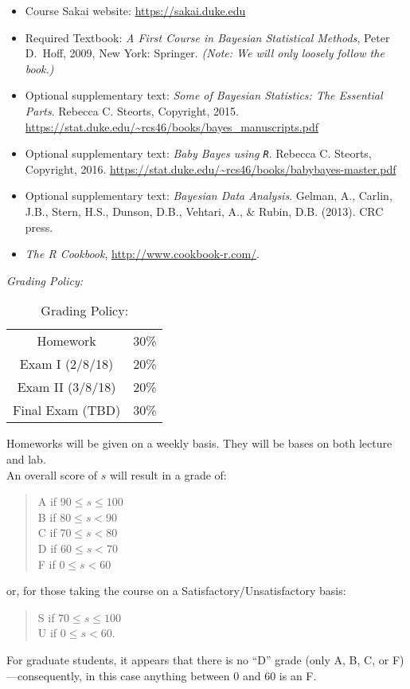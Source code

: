 \documentclass[11pt]{article}
\begin{document}
\begin{itemize}
\item[] Course Sakai website: \url{https://sakai.duke.edu}
\item[] Required Textbook: \textit{A First Course in Bayesian Statistical Methods}, Peter D.\ Hoff, 2009, New York: Springer. \textit{(Note: We will only loosely follow the book.)}
\item[] Optional supplementary text:  \textit{Some of Bayesian Statistics: The Essential Parts}. Rebecca C. Steorts, Copyright, 2015. \url{https://stat.duke.edu/~rcs46/books/bayes_manuscripts.pdf}
\item[] Optional supplementary text:  \textit{Baby Bayes using \texttt{R}}. Rebecca C. Steorts, Copyright, 2016. 
\url{https://stat.duke.edu/~rcs46/books/babybayes-master.pdf}
\item[] Optional supplementary text:  \textit{Bayesian Data Analysis}. Gelman, A., Carlin, J.B., Stern, H.S., Dunson, D.B., Vehtari, A., \& Rubin, D.B. (2013). CRC press.
\item[] \emph{The R Cookbook}, \url{http://www.cookbook-r.com/}.
\end{itemize}

\emph{Grading Policy:} 

\begin{table}[ht]
\caption{Grading Policy:}
\begin{center}
\begin{tabular}{cc}
Homework &30\%\\
Exam I (2/8/18) &20\%\\
Exam  II (3/8/18) & 20\%\\
Final Exam  (TBD) & 30\%\\
\end{tabular}
\end{center}
\label{default}
\end{table}%

Homeworks will be given on a weekly basis. They will be bases on both lecture and lab. \\

An overall score of $s$ will result in a grade of:
\begin{quote}
A if $90\leq s\leq 100$ \\
B if $80\leq s < 90$ \\
C if $70\leq s < 80$ \\
D if $60\leq s < 70$ \\
F if $0\leq s < 60$
\end{quote}
or, for those taking the course on a Satisfactory/Unsatisfactory basis:
\begin{quote}
S if $70\leq s\leq 100$ \\
U if $0\leq s < 60$.
\end{quote}
For graduate students, it appears that there is no ``D'' grade (only A, B, C, or F)---consequently, in this case anything between $0$ and $60$ is an F. \\
\end{document}
